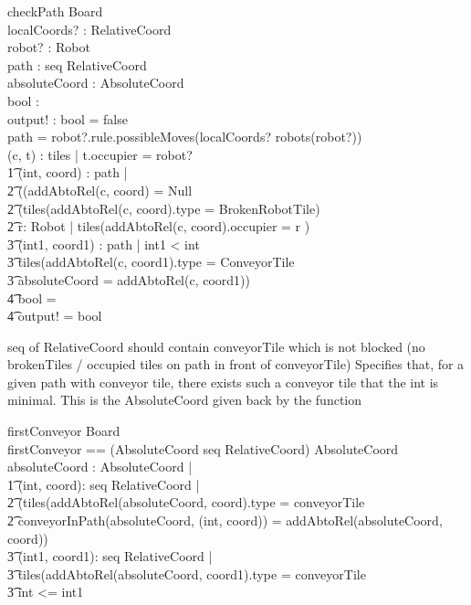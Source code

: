 \documentclass[a4paper,11pt]{article}
\begin{document}
\begin{schema}{checkPath}
\Xi Board \\
localCoords? : RelativeCoord \\
robot? : Robot \\
path : seq RelativeCoord \\
absoluteCoord : AbsoluteCoord \\
bool : \bool \\
output! : \bool
\where
bool = false \\
path = robot?.rule.possibleMoves(localCoords? \cross robots(robot?)) \\
\exists (c, t) : tiles | t.occupier = robot? \implies \\ \t1
\forall (int, coord) : path | \\ \t2
((addAbtoRel(c, coord) = Null \vee \\ \t2
(tiles(addAbtoRel(c, coord).type = BrokenRobotTile) \vee \\ \t2
\exists r: Robot | tiles(addAbtoRel(c, coord).occupier = r )\implies \\ \t3
\exists (int1, coord1) : path | int1 < int \\ \t3
tiles(addAbtoRel(c, coord1).type = ConveyorTile \\ \t3
absoluteCoord = addAbtoRel(c, coord1)) \implies \\ \t4
bool = \true \\ \t4
output! = bool
\end{schema}


seq of RelativeCoord should contain conveyorTile which is not blocked (no brokenTiles / occupied tiles on path in front of conveyorTile)
Specifies that, for a given path with conveyor tile, there exists such a conveyor tile that the int is minimal. This is the AbsoluteCoord given back by the function
\begin{schema}{firstConveyor}
\Xi Board \\
firstConveyor == (AbsoluteCoord \cross seq RelativeCoord) \rightarrow AbsoluteCoord
\where
\exists absoluteCoord : AbsoluteCoord |  \\ \t1
\exists (int, coord): seq RelativeCoord |  \\ \t2
(tiles(addAbtoRel(absoluteCoord, coord).type = conveyorTile \\ \t2
conveyorInPath(absoluteCoord, (int, coord)) = addAbtoRel(absoluteCoord, coord)) \implies \\ \t3
\forall (int1, coord1): seq RelativeCoord | \\ \t3
\IF tiles(addAbtoRel(absoluteCoord, coord1).type = conveyorTile \\ \t3
\THEN int <= int1
\end{schema}
\end{document}
